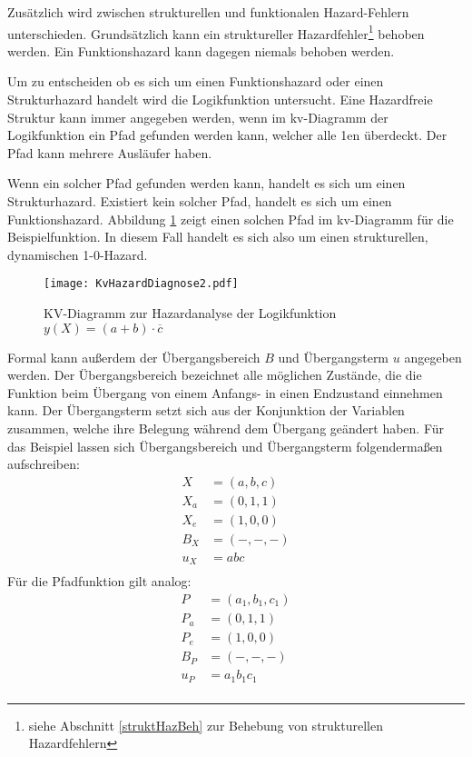 Zusätzlich wird zwischen strukturellen und funktionalen Hazard-Fehlern unterschieden. Grundsätzlich kann ein struktureller Hazardfehler\footnote{siehe Abschnitt \ref{struktHazBeh} zur Behebung von strukturellen Hazardfehlern} behoben werden. Ein Funktionshazard kann dagegen niemals behoben werden.

Um zu entscheiden ob es sich um einen Funktionshazard oder einen Strukturhazard handelt wird die Logikfunktion untersucht. Eine Hazardfreie Struktur kann immer angegeben werden, wenn im {\sc kv}-Diagramm der Logikfunktion ein Pfad gefunden werden kann, welcher alle 1en überdeckt. Der Pfad kann mehrere Ausläufer haben. 

Wenn ein solcher Pfad gefunden werden kann, handelt es sich um einen Strukturhazard. Existiert kein solcher Pfad, handelt es sich um einen Funktionshazard. Abbildung \ref{KvHazDiag2} zeigt einen solchen Pfad im {\sc kv}-Diagramm für die Beispielfunktion. In diesem Fall handelt es sich also um einen strukturellen, dynamischen 1-0-Hazard.
\begin{figure}[htp]
	\centering
	\texttt{[image: KvHazardDiagnose2.pdf]}
	\caption{KV-Diagramm zur Hazardanalyse der Logikfunktion $y(X) = (a + b) \cdot \overline{c}$}
	\label{KvHazDiag2}
\end{figure}

Formal kann außerdem der Übergangsbereich $B$ und Übergangsterm $u$ angegeben werden. Der Übergangsbereich bezeichnet alle möglichen Zustände, die die Funktion beim Übergang von einem Anfangs- in einen Endzustand einnehmen kann. Der Übergangsterm setzt sich aus der Konjunktion der Variablen zusammen, welche ihre Belegung während dem Übergang geändert haben. Für das Beispiel lassen sich Übergangsbereich und Übergangsterm folgendermaßen aufschreiben:
\begin{align*}
X   &= (a,b,c) \\
X_a &= (0,1,1) \\
X_e &= (1,0,0) \\
B_X &= (-,-,-) \\
u_X &= abc     \\
\end{align*}
Für die Pfadfunktion gilt analog:
\begin{align*}
P   &= (a_1,b_1,c_1) \\
P_a &= (0,1,1)       \\
P_e &= (1,0,0)       \\
B_P &= (-,-,-)       \\
u_P &= a_1b_1c_1     \\
\end{align*}

